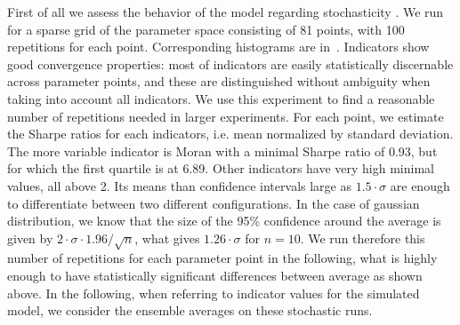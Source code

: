 \documentclass[10pt,letterpaper]{article}
\begin{document}
First of all we  assess the behavior of the model regarding stochasticity . We run  for a sparse grid of the parameter space consisting of 81 points, with 100 repetitions for each point. Corresponding histograms are  in~. Indicators show good convergence properties: most of indicators are easily statistically discernable across parameter points, and these are distinguished without ambiguity when taking into account all indicators. We use this experiment to find a reasonable number of repetitions needed in larger experiments. For each point, we estimate the Sharpe ratios for each indicators, i.e. mean normalized by standard deviation. The more variable indicator is Moran with a minimal Sharpe ratio of 0.93, but for which the first quartile is at 6.89. Other indicators have very high minimal values, all above 2. Its means than confidence intervals large as $1.5 \cdot \sigma$ are enough to differentiate between two different configurations. In the case of gaussian distribution, we know that the size of the 95\% confidence around the average is given by $2\cdot \sigma \cdot 1.96 / \sqrt{n}$, what gives $1.26 \cdot \sigma$ for $n=10$. We run therefore this number of repetitions for each parameter point in the following, what is highly enough to have statistically significant differences between average as shown above. In the following, when referring to indicator values for the simulated model, we consider the ensemble averages on these stochastic runs.

\end{document}
